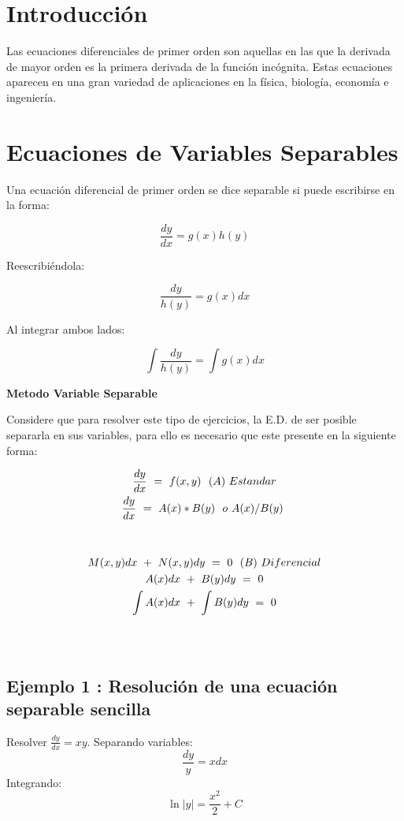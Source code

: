 \section{Introducción}
Las ecuaciones diferenciales de primer orden son aquellas en las que la derivada de mayor orden es la primera derivada de la función incógnita. Estas ecuaciones aparecen en una gran variedad de aplicaciones en la física, biología, economía e ingeniería.

\section{Ecuaciones de Variables Separables}
Una ecuación diferencial de primer orden se dice separable si puede escribirse en la forma:

\begin{equation}
\frac{dy}{dx} = g(x)h(y)
\end{equation}

Reescribiéndola:

\begin{equation}
\frac{dy}{h(y)} = g(x)dx
\end{equation}

Al integrar ambos lados:

\begin{equation}
\int \frac{dy}{h(y)} = \int g(x)dx
\end{equation}

\textbf{Metodo Variable Separable}

Considere que para resolver este tipo de ejercicios, la E.D. de ser posible separarla en sus variables, para ello es necesario que este presente en la siguiente forma:


\begin{gather}
\frac{dy}{dx} \ =\ f( x,y) \ \ ( A) \ Estandar\\
\frac{dy}{dx} \ =\ A( x) *B( y) \ \ o\ A( x) /B( y) \  \notag\\
 \notag\\
 \notag\\
M( x,y) dx\ +\ N( x,y) dy\ =\ 0\ \ ( B) \ Diferencial\\
A( x) dx\ +\ B( y) dy\ =\ 0 \notag\\
\int A( x) dx\ +\ \int B( y) dy\ =\ 0 \notag\\
 \notag\\
 \notag
\end{gather}

\subsection*{Ejemplo 1 : Resolución de una ecuación separable sencilla}
Resolver \( \frac{dy}{dx} = x y \).
Separando variables:
\begin{equation}
\frac{dy}{y} = x dx
\end{equation}
Integrando:
\begin{equation}
\ln |y| = \frac{x^2}{2} + C
\end{equation}


